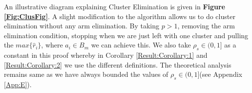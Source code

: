 
An illustrative diagram explaining Cluster Elimination is given in \textbf{Figure \ref{Fig:ClusFig}}. A slight modification to the algorithm allows us to do cluster elimination without any arm elimination. By taking $p>1$, removing the arm elimination condition, stopping when we are just left with one cluster and pulling the $max\lbrace \hat{r}_{i}\rbrace$, where $a_{i}\in B_{m}$ we can achieve this. We also take $\rho_{s}\in (0,1]$ as a constant in this proof whereby in Corollary \ref{Result:Corollary:1} and \ref{Result:Corollary:2} we use the different definitions. The theoretical analysis remains same as we have always bounded the values of $\rho_{s}\in (0,1]$(see Appendix \ref{App:E}). 
 

